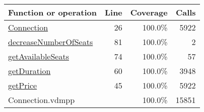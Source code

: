 \bigskip
\begin{longtable}{|l|r|r|r|}
\hline
Function or operation & Line & Coverage & Calls \\
\hline
\hline
\hyperref[Connection:26]{Connection} & 26&100.0\% & 5922 \\
\hline
\hyperref[decreaseNumberOfSeats:81]{decreaseNumberOfSeats} & 81&100.0\% & 2 \\
\hline
\hyperref[getAvailableSeats:74]{getAvailableSeats} & 74&100.0\% & 57 \\
\hline
\hyperref[getDuration:60]{getDuration} & 60&100.0\% & 3948 \\
\hline
\hyperref[getPrice:45]{getPrice} & 45&100.0\% & 5922 \\
\hline
\hline
Connection.vdmpp & & 100.0\% & 15851 \\
\hline
\end{longtable}

